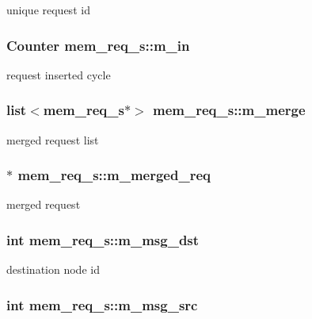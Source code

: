 \label{structmem__req__s_aa1ce2eda1984474c5304bc52e0f96445}
unique request id \hypertarget{structmem__req__s_a2755c0f5390e5101c68dcfa17835f060}{
\subsubsection[{m\_\-in}]{\setlength{\rightskip}{0pt plus 5cm}Counter {\bf mem\_\-req\_\-s::m\_\-in}}}
\label{structmem__req__s_a2755c0f5390e5101c68dcfa17835f060}
request inserted cycle \hypertarget{structmem__req__s_a821fa41554b58f5c5b1b751b6e5f1721}{
\subsubsection[{m\_\-merge}]{\setlength{\rightskip}{0pt plus 5cm}list$<${\bf mem\_\-req\_\-s}$\ast$$>$ {\bf mem\_\-req\_\-s::m\_\-merge}}}
\label{structmem__req__s_a821fa41554b58f5c5b1b751b6e5f1721}
merged request list \hypertarget{structmem__req__s_a3b87d3a717d7bb0f87634a8c7504a5b5}{
\subsubsection[{m\_\-merged\_\-req}]{$\ast$ {\bf mem\_\-req\_\-s::m\_\-merged\_\-req}}}
\label{structmem__req__s_a3b87d3a717d7bb0f87634a8c7504a5b5}
merged request \hypertarget{structmem__req__s_a16204d197e4dab80807c947af110160e}{
\subsubsection[{m\_\-msg\_\-dst}]{\setlength{\rightskip}{0pt plus 5cm}int {\bf mem\_\-req\_\-s::m\_\-msg\_\-dst}}}
\label{structmem__req__s_a16204d197e4dab80807c947af110160e}
destination node id \hypertarget{structmem__req__s_a858166c5e9fa9c8078088c6e04941a9f}{
\subsubsection[{m\_\-msg\_\-src}]{\setlength{\rightskip}{0pt plus 5cm}int {\bf mem\_\-req\_\-s::m\_\-msg\_\-src}}}
